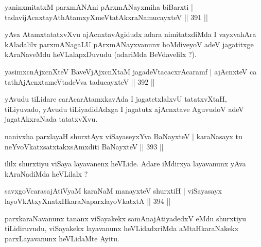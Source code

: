 
\begin{shl}
yaninxmitatxM parxmANAni pArxmANayxmiha biBarxti |
tadavijAcnxtayAthAtamxyXmeVtatAkxraNamucayxteV \hfill || 391 ||
\end{shl}

\begin{artha}
yAva AtamxtatatxvXvu ajAcnxtavAgidudx adara nimitatxdiMda I vayxvahAra kAladalilx parxmANagaLU pArxmANayxvanunx hoMdiveyoV adeV jagatitxge kAraNaveMdu heVLalapxDuvudu (adariMda BeVdavelilx ?).
\end{artha}


\begin{shl}
yasimxcnAjxcnXteV BaveVjAjxcnXtaM jagadeVtacacxrAcaramf |
ajAcnxteV ca tathA\s jAcnxtameVtadeVva taducayxteV \hfill || 392 ||
\end{shl}

\begin{artha}
yAvudu tiLidare carAcarAtamxkavAda I jagatetxlalxvU tatatxvXtaH, tiLiyuvado, yAvudu tiLiyadidAdxga I jagatutx ajAcnxtave AguvudoV adeV jagatAkxraNada tatatxvXvu.
\end{artha}


\begin{shl}
nanivxha parxlayaH shurxtAyx viSayaseyxYva BaNayxteV |
karaNasayx tu neYvoVkatxsatxtakxsAmxditi BaNayxteV \hfill || 393 ||
\end{shl}

\begin{artha}
ililx shurxtiyu viSaya layavanenx heVLide. Adare iMdirxya layavanunx yAva kAraNadiMda heVLilalx ?
\end{artha}


\begin{shl}
savxgoVcarasajAtiVyaM karaNaM manayxteV shurxtiH |
viSayasayx layoVkAtxyX\s natxHkaraNaparxlayoVkatxtA \hfill || 394 ||
\end{shl}

\begin{artha}
parxkaraNavanunx tananx viSayakekx samAnajAtiyadedxV eMdu shurxtiyu tiLidiru\-vudu, viSayakekx layavanunx heVLidadxriMda aMtaHkaraNakekx parxLayavanunx heVLidaMte Ayitu.
\end{artha}

